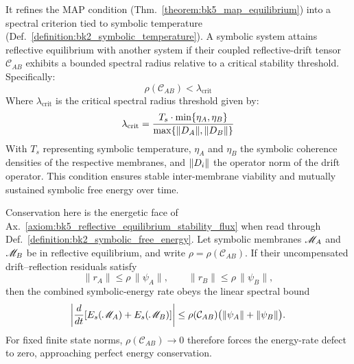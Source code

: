 \begin{axiom}
\label{axiom:bk5_reflective_equilibrium_stability_flux}
It refines the MAP condition (Thm.~\ref{theorem:bk5_map_equilibrium}) into a spectral criterion tied to symbolic temperature (Def.~\ref{definition:bk2_symbolic_temperature}).
A symbolic system attains reflective equilibrium with another system if their coupled reflective-drift tensor $\mathcal{C}_{AB}$ exhibits a bounded spectral radius relative to a critical stability threshold. Specifically:
\begin{equation}
\rho(\mathcal{C}_{AB}) < \lambda_{\text{crit}}
\end{equation}
Where $\lambda_{\text{crit}}$ is the critical spectral radius threshold given by:
\begin{equation}
\lambda_{\text{crit}} = \frac{T_s \cdot \min\{\eta_A, \eta_B\}}{\max\{\|D_A\|, \|D_B\|\}} 
\end{equation}
With $T_s$ representing symbolic temperature, $\eta_A$ and $\eta_B$ the symbolic coherence densities of the respective membranes, and $\|D_i\|$ the operator norm of the drift operator.
This condition ensures stable inter-membrane viability and mutually sustained symbolic free energy over time.
\end{axiom}
\begin{theorem}
\label{theorem:bk5_reflective_equilibrium_conservation}
Conservation here is the energetic face of
Ax.~\ref{axiom:bk5_reflective_equilibrium_stability_flux} when read through
Def.~\ref{definition:bk2_symbolic_free_energy}.  Let symbolic membranes
$\mathscr{M}_A$ and $\mathscr{M}_B$ be in reflective equilibrium, and write
$\rho=\rho(\mathcal C_{AB})$.  If their uncompensated drift--reflection
residuals satisfy
\[
\|r_A\|\le \rho\,\|\psi_A\|,
\qquad
\|r_B\|\le \rho\,\|\psi_B\|,
\]
then the combined symbolic-energy rate obeys the linear spectral bound
\[
\left|\frac{d}{dt}
  [E_s(\mathscr{M}_A)+E_s(\mathscr{M}_B)]\right|
\le
\rho(\mathcal C_{AB})
\bigl(\|\psi_A\|+\|\psi_B\|\bigr).
\]
For fixed finite state norms, $\rho(\mathcal C_{AB})\to0$ therefore forces the
energy-rate defect to zero, approaching perfect energy conservation.
\end{theorem}
